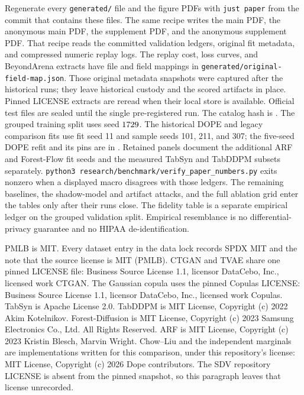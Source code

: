 Regenerate every \texttt{generated/} file and the figure PDFs with \texttt{just paper} from the commit that contains these files. The same recipe writes the main PDF, the anonymous main PDF, the supplement PDF, and the anonymous supplement PDF. That recipe reads the committed validation ledgers, original fit metadata, and compressed numeric replay logs. The replay cost, loss curves, and BeyondArena extracts have file and field mappings in \texttt{generated/original-field-map.json}. Those original metadata snapshots were captured after the historical runs; they leave historical custody and the scored artifacts in place. Pinned LICENSE extracts are reread when their local store is available. Official test files are sealed until the single pre-registered run. The catalog hash is \CatalogSha. The grouped training split uses seed $1729$. The historical DOPE and legacy comparison fits use fit seed 11 and sample seeds 101, 211, and 307; the five-seed DOPE refit and its pins are in . Retained panels document the additional ARF and Forest-Flow fit seeds and the measured TabSyn and TabDDPM subsets separately. \texttt{python3 research/benchmark/verify\_paper\_numbers.py} exits nonzero when a displayed macro disagrees with those ledgers. The remaining baselines, the shadow-model and artifact attacks, and the full ablation grid enter the tables only after their runs close. The fidelity table is a separate empirical ledger on the grouped validation split. Empirical resemblance is no differential-privacy guarantee and no HIPAA de-identification.

PMLB is MIT. Every dataset entry in the data lock records SPDX MIT and the note that the source license is MIT (PMLB). CTGAN and TVAE share one pinned LICENSE file: Business Source License 1.1, licensor DataCebo, Inc., licensed work CTGAN. The Gaussian copula uses the pinned Copulas LICENSE: Business Source License 1.1, licensor DataCebo, Inc., licensed work Copulas. TabSyn is Apache License 2.0. TabDDPM is MIT License, Copyright (c) 2022 Akim Kotelnikov. Forest-Diffusion is MIT License, Copyright (c) 2023 Samsung Electronics Co., Ltd. All Rights Reserved. ARF is MIT License, Copyright (c) 2023 Kristin Blesch, Marvin Wright. Chow--Liu and the independent marginals are implementations written for this comparison, under this repository's license: MIT License, Copyright (c) 2026 Dope contributors. The SDV repository LICENSE is absent from the pinned snapshot, so this paragraph leaves that license unrecorded.
